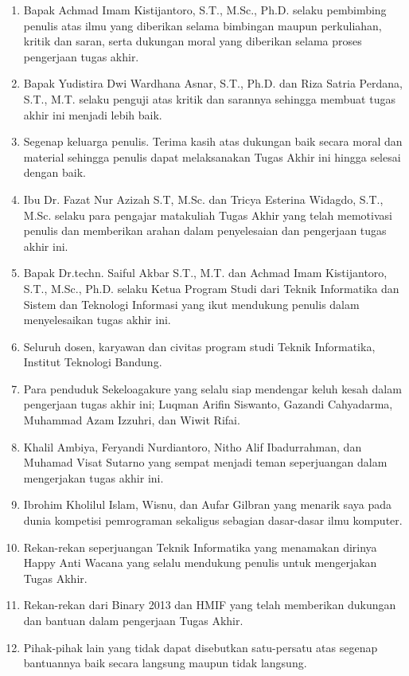 \begin{enumerate}
    \item Bapak Achmad Imam Kistijantoro, S.T., M.Sc., Ph.D. selaku pembimbing penulis atas ilmu yang diberikan selama bimbingan maupun perkuliahan, kritik dan saran, serta dukungan moral yang diberikan selama proses pengerjaan tugas akhir.

    \item Bapak Yudistira Dwi Wardhana Asnar, S.T., Ph.D. dan Riza Satria Perdana, S.T., M.T. selaku penguji atas kritik dan sarannya sehingga membuat tugas akhir ini menjadi lebih baik.

    \item Segenap keluarga penulis. Terima kasih atas dukungan baik secara moral dan material sehingga penulis dapat melaksanakan Tugas Akhir ini hingga selesai dengan baik.
    
    \item Ibu Dr. Fazat Nur Azizah S.T, M.Sc. dan Tricya Esterina Widagdo, S.T., M.Sc. selaku para pengajar matakuliah Tugas Akhir yang telah memotivasi penulis dan memberikan arahan dalam penyelesaian dan pengerjaan tugas akhir ini.
    
	\item Bapak Dr.techn. Saiful Akbar S.T., M.T. dan Achmad Imam Kistijantoro, S.T., M.Sc., Ph.D. selaku Ketua Program Studi dari Teknik Informatika dan Sistem dan Teknologi Informasi yang ikut mendukung penulis dalam menyelesaikan tugas akhir ini.
    
    \item Seluruh dosen, karyawan dan civitas program studi Teknik Informatika, Institut Teknologi Bandung.
    
    \item Para penduduk Sekeloagakure yang selalu siap mendengar keluh kesah dalam pengerjaan tugas akhir ini; Luqman Arifin Siswanto, Gazandi Cahyadarma, Muhammad Azam Izzuhri, dan Wiwit Rifai.

    \item Khalil Ambiya, Feryandi Nurdiantoro, Nitho Alif Ibadurrahman, dan Muhamad Visat Sutarno yang sempat menjadi teman seperjuangan dalam mengerjakan tugas akhir ini.

    \item Ibrohim Kholilul Islam, Wisnu, dan Aufar Gilbran yang menarik saya pada dunia kompetisi pemrograman sekaligus sebagian dasar-dasar ilmu komputer.
    
    \item Rekan-rekan seperjuangan Teknik Informatika yang menamakan dirinya Happy Anti Wacana yang selalu mendukung penulis untuk mengerjakan Tugas Akhir.
    
    \item Rekan-rekan dari Binary 2013 dan HMIF yang telah memberikan dukungan dan bantuan dalam pengerjaan Tugas Akhir.
    
    \item Pihak-pihak lain yang tidak dapat disebutkan satu-persatu atas segenap bantuannya baik secara langsung maupun tidak langsung.
\end{enumerate}

